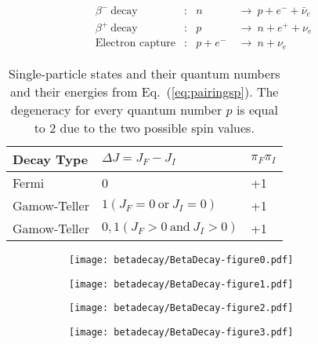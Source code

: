 \documentclass[thesis.tex]{subfiles}
\begin{document}
\begin{align}
  \beta^{-}\ \text{decay}&:    &   n\ &\longrightarrow\ p + e^{-} + \bar{\nu}_{e} \\
  \beta^{+}\ \text{decay}&:    &   p\ &\longrightarrow\ n + e^{+} + \nu_{e} \\
  \text{Electron capture}&:  &   p + e^{-}\ &\longrightarrow\ n + \nu_{e}
\end{align}

\begin{table}
  \centering
  \begin{tabular}{ l @{\hskip 50pt} l @{\hskip 50pt} l } \hline
    Decay Type     & $\Delta J = J_{F} - J_{I}$ & $\pi_{F}\pi_{I}$ \\ \hline\hline
    Fermi          & 0                         & +1 \\
    Gamow-Teller   & $1    (J_{F}=0\ \text{or}\ J_{I}=0)$   & +1 \\
    Gamow-Teller   & $0,1  (J_{F}>0\ \text{and}\ J_{I}>0)$  & +1 \\ \hline
  \end{tabular}
  \caption{Single-particle states and their quantum numbers and their energies from Eq.~(\ref{eq:pairingsp}). The degeneracy for every quantum number $p$ is equal to 2 due to the two possible spin values.}
  \label{tab:pairingmodelsp}
\end{table}

\begin{figure}
  \centering
  \begin{subfigure}{0.5\linewidth}
    \centering
    \hspace{1.1cm}
    \texttt{[image: betadecay/BetaDecay-figure0.pdf]}
  \end{subfigure}
  \hspace{-0.25\linewidth}
  \begin{subfigure}{0.5\linewidth}
    \centering
    \hspace{1.1cm}
    \texttt{[image: betadecay/BetaDecay-figure1.pdf]}
  \end{subfigure}
\end{figure}

\begin{figure}
  \centering
  \begin{subfigure}{0.5\linewidth}
    \centering
    \hspace{1.1cm}
    \texttt{[image: betadecay/BetaDecay-figure2.pdf]}
  \end{subfigure}
  \hspace{-0.225\linewidth}
  \begin{subfigure}{0.5\linewidth}
    \centering
    \hspace{1.1cm}
    \texttt{[image: betadecay/BetaDecay-figure3.pdf]}
  \end{subfigure}
\end{figure}
\end{document}
